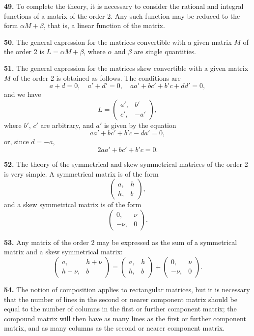 \documentclass[12pt,a4paper]{article}
\theoremstyle{definition}
\begin{document}
\medskip
\noindent\textbf{49.} To complete the theory, it is necessary to consider the rational and integral functions of a matrix of the order 2. Any such function may be reduced to the form $\alpha M + \beta$, that is, a linear function of the matrix.

\medskip
\noindent\textbf{50.} The general expression for the matrices convertible with a given matrix $M$ of the order 2 is $L = \alpha M + \beta$, where $\alpha$ and $\beta$ are single quantities.

\medskip
\noindent\textbf{51.} The general expression for the matrices skew convertible with a given matrix $M$ of the order 2 is obtained as follows. The conditions are
\[
a+d=0,\quad a'+d'=0,\quad aa'+bc'+b'c+dd'=0,
\]
and we have
\[
L = \begin{pmatrix} a', & b' \\ c', & -a' \end{pmatrix},
\]
where $b'$, $c'$ are arbitrary, and $a'$ is given by the equation
\[aa' + bc' + b'c - da' = 0,\]
or, since $d=-a$,
\[2aa' + bc' + b'c = 0.\]

\medskip
\noindent\textbf{52.} The theory of the symmetrical and skew symmetrical matrices of the order 2 is very simple. A symmetrical matrix is of the form
\[
\begin{pmatrix} a, & h \\ h, & b \end{pmatrix},
\]
and a skew symmetrical matrix is of the form
\[
\begin{pmatrix} 0, & \nu \\ -\nu, & 0 \end{pmatrix}.
\]

\medskip
\noindent\textbf{53.} Any matrix of the order 2 may be expressed as the sum of a symmetrical matrix and a skew symmetrical matrix:
\[
\begin{pmatrix} a, & h+\nu \\ h-\nu, & b \end{pmatrix}
= \begin{pmatrix} a, & h \\ h, & b \end{pmatrix}
+ \begin{pmatrix} 0, & \nu \\ -\nu, & 0 \end{pmatrix}.
\]

\newpage

\medskip
\noindent\textbf{54.} The notion of composition applies to rectangular matrices, but it is necessary that the number of lines in the second or nearer component matrix should be equal to the number of columns in the first or further component matrix; the compound matrix will then have as many lines as the first or further component matrix, and as many columns as the second or nearer component matrix.
\end{document}

